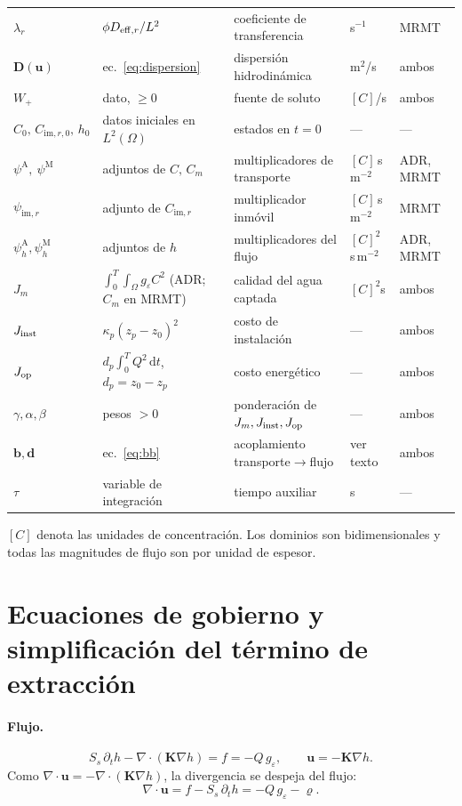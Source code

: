 \documentclass[11pt]{article}
\numberwithin{equation}{section}
\theoremstyle{remark}
\newcommand{\bu}{\mathbf{u}}
\newcommand{\bK}{\mathbf{K}}
\newcommand{\bD}{\mathbf{D}}
\newcommand{\bb}{\mathbf{b}}
\newcommand{\bd}{\mathbf{d}}
\newcommand{\geps}{g_\varepsilon}
\newcommand{\im}{\mathrm{im}}
\newcommand{\vr}{\varrho}              %
\newcommand{\pA}{\psi^{\mathrm{A}}}    %
\newcommand{\pM}{\psi^{\mathrm{M}}}    %
\newcommand{\pim}{\psi_{\im,r}}          %
\newcommand{\ph}[1]{\psi_h^{\mathrm{#1}}}  %
\newcommand{\dd}{\,\mathrm{d}}
\begin{document}
{\begin{longtable}{@{}p{1.9cm}p{4.6cm}p{4.2cm}p{1.9cm}p{1.2cm}@{}}
$\lambda_r$ & $\phi D_{{\rm eff},r}/L^2$ & coeficiente de transferencia & s$^{-1}$ & MRMT\\
$\bD(\bu)$ & ec.~\eqref{eq:dispersion} & dispersi\'on hidrodin\'amica & m$^2$/s & ambos\\
$W_+$ & dato, $\ge0$ & fuente de soluto & $[C]$/s & ambos\\
$C_0,\,C_{\im,r,0},\,h_0$ & datos iniciales en $L^2(\Omega)$ & estados en $t=0$ & ---& ---\\
$\pA,\ \pM$ & adjuntos de $C,\,C_m$ & multiplicadores de transporte & $[C]\,$s\,m$^{-2}$ & ADR, MRMT\\
$\pim$ & adjunto de $C_{\im,r}$ & multiplicador inm\'ovil & $[C]\,$s\,m$^{-2}$ & MRMT\\
$\ph{A},\ph{M}$ & adjuntos de $h$ & multiplicadores del flujo & $[C]^2$s\,m$^{-2}$ & ADR, MRMT\\
$J_m$ & $\int_0^T\!\!\int_\Omega\geps C^2$ (ADR; $C_m$ en MRMT) & calidad del agua captada & $[C]^2$s & ambos\\
$J_{\rm inst}$ & $\kappa_p(z_p-z_0)^2$ & costo de instalaci\'on & --- & ambos\\
$J_{\rm op}$ & $d_p\int_0^TQ^2\dd t$,\ $d_p=z_0-z_p$ & costo energ\'etico & --- & ambos\\
$\gamma,\alpha,\beta$ & pesos $>0$ & ponderaci\'on de $J_m,J_{\rm inst},J_{\rm op}$ & --- & ambos\\
$\bb,\bd$ & ec.~\eqref{eq:bb} & acoplamiento transporte$\to$flujo & ver texto & ambos\\
$\tau$ & variable de integraci\'on & tiempo auxiliar & s & ---\\
\bottomrule
\end{longtable}}

$[C]$ denota las unidades de concentraci\'on. Los dominios son bidimensionales y todas las
magnitudes de flujo son por unidad de espesor.

\section{Ecuaciones de gobierno y simplificaci\'on del t\'ermino de extracci\'on}
\label{sec:gobierno}

\paragraph{Flujo.}
\begin{equation}
S_s\,\partial_th-\nabla\!\cdot(\bK\nabla h)=f=-Q\,\geps,\qquad \bu=-\bK\nabla h.
\label{eq:flujo}
\end{equation}
Como $\nabla\!\cdot\bu=-\nabla\!\cdot(\bK\nabla h)$, la divergencia se despeja del flujo:
\begin{equation}
\nabla\!\cdot\bu=f-S_s\,\partial_th=-Q\,\geps-\vr .
\label{eq:div_u}
\end{equation}
\end{document}
